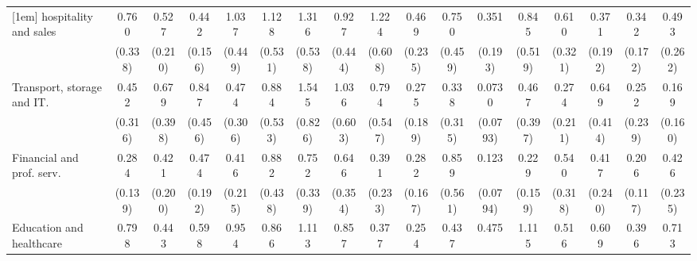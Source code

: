 {\begin{tabular}{l*{16}{c}}
[1em]
hospitality and sales&       0.760         &       0.527         &       0.442\sym{*}  &       1.037         &       1.128         &       1.316         &       0.927         &       1.224         &       0.469         &       0.750         &       0.351         &       0.845         &       0.610         &       0.371         &       0.342\sym{*}  &       0.493         \\
                    &     (0.338)         &     (0.210)         &     (0.156)         &     (0.449)         &     (0.531)         &     (0.538)         &     (0.444)         &     (0.608)         &     (0.235)         &     (0.459)         &     (0.193)         &     (0.519)         &     (0.321)         &     (0.192)         &     (0.172)         &     (0.262)         \\
[1em]
Transport, storage and IT.&       0.452         &       0.679         &       0.847         &       0.474         &       0.884         &       1.545         &       1.036         &       0.794         &       0.275         &       0.338         &      0.0730\sym{*}  &       0.467         &       0.274         &       0.649         &       0.252         &       0.169         \\
                    &     (0.316)         &     (0.398)         &     (0.456)         &     (0.306)         &     (0.533)         &     (0.826)         &     (0.603)         &     (0.547)         &     (0.189)         &     (0.315)         &    (0.0793)         &     (0.397)         &     (0.211)         &     (0.414)         &     (0.239)         &     (0.160)         \\
[1em]
Financial and prof. serv.&       0.284\sym{*}  &       0.421         &       0.474         &       0.416         &       0.882         &       0.752         &       0.646         &       0.391         &       0.282\sym{*}  &       0.859         &       0.123\sym{**} &       0.229\sym{*}  &       0.540         &       0.417         &       0.206\sym{**} &       0.426         \\
                    &     (0.139)         &     (0.200)         &     (0.192)         &     (0.215)         &     (0.438)         &     (0.339)         &     (0.354)         &     (0.233)         &     (0.167)         &     (0.561)         &    (0.0794)         &     (0.159)         &     (0.318)         &     (0.240)         &     (0.117)         &     (0.235)         \\
[1em]
Education and healthcare&       0.798         &       0.443         &       0.598         &       0.954         &       0.866         &       1.113         &       0.857         &       0.377         &       0.254\sym{**} &       0.437         &       0.475         &       1.115         &       0.516         &       0.609         &       0.396         &       0.713         \\

\end{tabular}}

